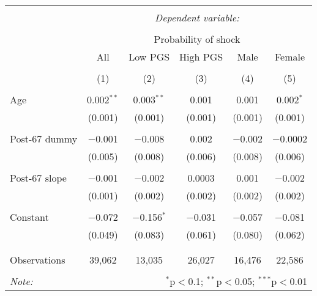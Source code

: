 
\begin{tabular}{@{\extracolsep{5pt}}lccccc} 
\\[-1.8ex]\hline 
\hline \\[-1.8ex] 
 & \multicolumn{5}{c}{\textit{Dependent variable:}} \\ 
\cline{2-6} 
\\[-1.8ex] & \multicolumn{5}{c}{Probability of shock} \\ 
 & All & Low PGS & High PGS & Male & Female \\ 
\\[-1.8ex] & (1) & (2) & (3) & (4) & (5)\\ 
\hline \\[-1.8ex] 
 Age & 0.002$^{**}$ & 0.003$^{**}$ & 0.001 & 0.001 & 0.002$^{*}$ \\ 
  & (0.001) & (0.001) & (0.001) & (0.001) & (0.001) \\ 
  & & & & & \\ 
 Post-67 dummy & $-$0.001 & $-$0.008 & 0.002 & $-$0.002 & $-$0.0002 \\ 
  & (0.005) & (0.008) & (0.006) & (0.008) & (0.006) \\ 
  & & & & & \\ 
 Post-67 slope & $-$0.001 & $-$0.002 & 0.0003 & 0.001 & $-$0.002 \\ 
  & (0.001) & (0.002) & (0.002) & (0.002) & (0.002) \\ 
  & & & & & \\ 
 Constant & $-$0.072 & $-$0.156$^{*}$ & $-$0.031 & $-$0.057 & $-$0.081 \\ 
  & (0.049) & (0.083) & (0.061) & (0.080) & (0.062) \\ 
  & & & & & \\ 
\hline \\[-1.8ex] 
Observations & 39,062 & 13,035 & 26,027 & 16,476 & 22,586 \\ 
\hline 
\hline \\[-1.8ex] 
\textit{Note:}  & \multicolumn{5}{r}{$^{*}$p$<$0.1; $^{**}$p$<$0.05; $^{***}$p$<$0.01} \\ 
\end{tabular} 
